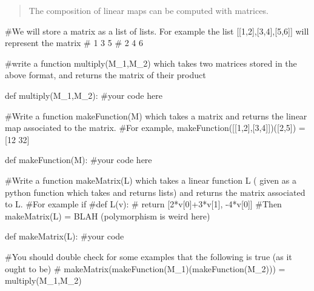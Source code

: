 \documentclass{article}
\begin{document}
\begin{abstract}
  The composition of linear maps can be computed with matrices.
\end{abstract}

\begin{python}
#We will store a matrix as a list of lists.   For example the list [[1,2],[3,4],[5,6]] will represent the matrix 
# 1 3 5
# 2 4 6
		
#write a function multiply(M_1,M_2) which takes two matrices stored in the above format, and returns the matrix of their product
		
def multiply(M_1,M_2):
  #your code here
		
#Write a function makeFunction(M) which takes a matrix and returns the linear map associated to the matrix.
#For example, makeFunction([[1,2],[3,4]])([2,5]) = [12 32]
		
def makeFunction(M):
  #your code here
		
#Write a function makeMatrix(L) which takes a linear function L ( given as a python function which takes and returns lists) and returns the matrix associated to L.
#For example if  
#def L(v):
#  return [2*v[0]+3*v[1], -4*v[0]]
#Then makeMatrix(L) = BLAH (polymorphism is weird here)
		
def makeMatrix(L):
  #your code 

  #You should double check for some examples that the following is true (as it ought to be)
  # makeMatrix(makeFunction(M_1)(makeFunction(M_2))) = multiply(M_1,M_2)
\end{python}

	
\end{document}
